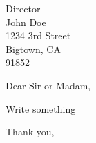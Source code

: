 \documentclass{letter}
\begin{document}
\begin{letter}{Director \\ John Doe \\ 1234 3rd Street \\ Bigtown, CA \\ 91852 }

\opening{Dear Sir or Madam,}

Write something

\closing{Thank you,}

\end{letter}
\end{document}
